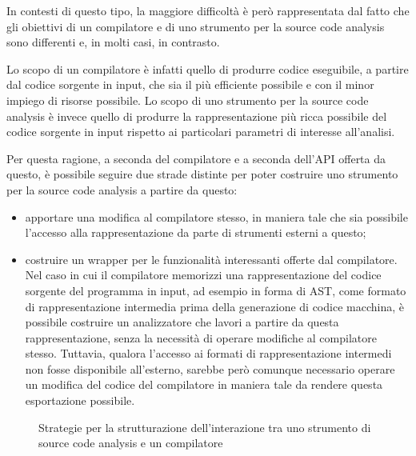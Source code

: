In contesti di questo tipo, la maggiore difficoltà è però rappresentata dal
fatto che gli obiettivi di un compilatore e di uno strumento per la source code
analysis sono differenti e, in molti casi, in contrasto.

Lo scopo di un compilatore è infatti quello di produrre codice eseguibile, a
partire dal codice sorgente in input, che sia il più efficiente possibile e con
il minor impiego di risorse possibile. Lo scopo di uno strumento per la source
code analysis è invece quello di produrre la rappresentazione più ricca
possibile del codice sorgente in input rispetto ai particolari parametri di
interesse all’analisi.

Per questa ragione, a seconda del compilatore e a seconda dell’API offerta da
questo, è possibile seguire due strade distinte per poter costruire uno
strumento per la source code analysis a partire da questo:

\begin{itemize}

\item apportare una modifica al compilatore stesso, in maniera tale che sia
possibile l'accesso alla rappresentazione da parte di strumenti esterni a
questo;

\item costruire un wrapper per le funzionalità interessanti offerte dal
compilatore. Nel caso in cui il compilatore memorizzi una rappresentazione del
codice sorgente del programma in input, ad esempio in forma di AST, come formato
di rappresentazione intermedia prima della generazione di codice macchina, è
possibile costruire un analizzatore che lavori a partire da questa
rappresentazione, senza la necessità di operare modifiche al compilatore stesso.
Tuttavia, qualora l’accesso ai formati di rappresentazione intermedi non fosse
disponibile all’esterno, sarebbe però comunque necessario operare un modifica
del codice del compilatore in maniera tale da rendere questa esportazione
possibile.

\end{itemize}

\begin{figure}
\caption{Strategie per la strutturazione dell'interazione tra uno strumento di
source code analysis e un compilatore}
\label{fig:sca-compiler-strategies}
\end{figure}

